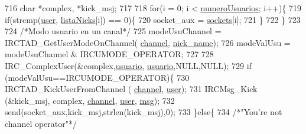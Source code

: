 \begin{DoxyCode}
{{{{{{{{{{716                                                 \textcolor{keywordtype}{char} *complex, *kick\_msj;
717 
718                                                 \textcolor{keywordflow}{for}(i = 0; i < \hyperlink{_g-2361-06-_p1-_server_8c_ac9a5ec6f534d2a8e2a870179807d32dc}{numeroUsuarios}; i++)\{
719                                                         \textcolor{keywordflow}{if}(strcmp(\hyperlink{_g-2361-06-_p1-_server_8c_a14871705f45ccdc5bb9f4549efd8e119}{user}, 
      \hyperlink{_g-2361-06-_p1-_server_8c_a713172366a6be2fbf8456a4b43702603}{listaNicks}[i]) == 0)\{
720                                                                 socket\_aux = 
      \hyperlink{_g-2361-06-_p1-_server_8c_a7724e53f22e431d1ecb6516951a172e1}{sockets}[i];
721                                                         \}
722                                                 \}
723 
724                                                 \textcolor{comment}{/*Modo usuario en un canal*/}
725                                                 modeUsuChannel = IRCTAD\_GetUserModeOnChannel(
      \hyperlink{_g-2361-06-_p1-_server_8c_a842ca2f026578e5c479c095ff3335969}{channel}, \hyperlink{_g-2361-06-_p1-_server_8c_aabbf66718cda228b924a4a9441eadf62}{nick\_name});
726                                                 modeValUsu = modeUsuChannel & IRCUMODE\_OPERATOR;
727 
728                                                 IRC\_ComplexUser(&complex,\hyperlink{_g-2361-06-_p1-_server_8c_a0147a5b81499984f9cb00379a8cb84af}{usuario},
      \hyperlink{_g-2361-06-_p1-_server_8c_a0147a5b81499984f9cb00379a8cb84af}{usuario},NULL,NULL);
729                                                 \textcolor{keywordflow}{if} (modeValUsu==IRCUMODE\_OPERATOR)\{
730                                                         IRCTAD\_KickUserFromChannel (
      \hyperlink{_g-2361-06-_p1-_server_8c_a842ca2f026578e5c479c095ff3335969}{channel}, \hyperlink{_g-2361-06-_p1-_server_8c_a14871705f45ccdc5bb9f4549efd8e119}{user});
731                                                         IRCMsg\_Kick (&kick\_msj, complex, 
      \hyperlink{_g-2361-06-_p1-_server_8c_a842ca2f026578e5c479c095ff3335969}{channel}, \hyperlink{_g-2361-06-_p1-_server_8c_a14871705f45ccdc5bb9f4549efd8e119}{user}, \hyperlink{_g-2361-06-_p1-_server_8c_a32d2f5216cddb59c7cc8fb2806a7e727}{msg});
732                                                         send(socket\_aux,kick\_msj,strlen(kick\_msj),0);
733                                                 \}\textcolor{keywordflow}{else}\{
734                                                         \textcolor{comment}{/*"You're not channel operator"*/}
}}}}}}}}}}
\end{DoxyCode}

